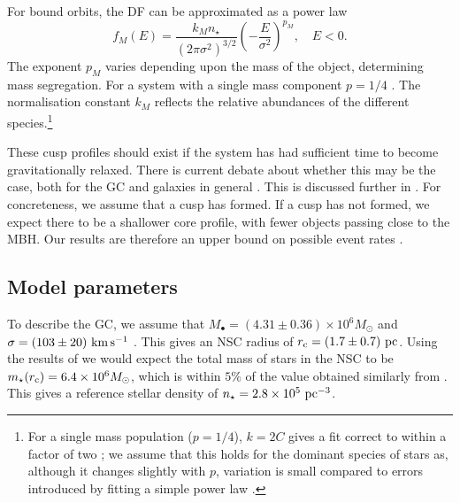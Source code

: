 For bound orbits, the DF can be approximated as a power law \citep{Peebles1972}
\begin{equation}
f_M(E) = \dfrac{k_M n_\star}{(2\pi\sigma^2)^{3/2}}\left(-\dfrac{E}{\sigma^2}\right)^{p_M},\quad E < 0.
\label{eq:Bound_DF}
\end{equation}
The exponent $p_M$ varies depending upon the mass of the object, determining mass segregation. For a system with a single mass component $p = 1/4$ \citep{Bahcall1976, Young1977}. The normalisation constant $k_M$ reflects the relative abundances of the different species.\footnote{For a single mass population ($p = 1/4$), $k = 2 C$ gives a fit correct to within a factor of two \citep{Bahcall1976,Keshet2009}; we assume that this holds for the dominant species of stars as, although it changes slightly with $p$, variation is small compared to errors introduced by fitting a simple power law \citep{Hopman2006, Alexander2009}.}

These cusp profiles should exist if the system has had sufficient time to become gravitationally relaxed. There is current debate about whether this may be the case, both for the GC and galaxies in general \citep[e.g.,][]{Schodel2007}. This is discussed further in . For concreteness, we assume that a cusp has formed. If a cusp has not formed, we expect there to be a shallower core profile, with fewer objects passing close to the MBH. Our results are therefore an upper bound on possible event rates \citep{Merritt2010a,Antonini2011,Gualandris2012}. 

\subsection{Model parameters}\label{sec:GC-Param}

To describe the GC, we assume that $M_\bullet = (4.31 \pm 0.36) \times 10^6 M_\odot$ \citep{Gillessen2009} and $\sigma = (103 \pm 20)~\mathrm{km\,s^{-1}}$ \citep{Tremaine2002}. This gives an NSC radius of $r_\mathrm{c} = (1.7 \pm 0.7)~\mathrm{pc}$. Using the results of \citet{Ghez2008} we would expect the total mass of stars in the NSC to be $m_\star(r_\mathrm{c}) = 6.4 \times 10^6 M_\odot$, which is within $5\%$ of the value obtained similarly from \citet{Genzel2003}. This gives a reference stellar density of $n_\star = 2.8 \times 10^5~\mathrm{pc^{-3}}$.

